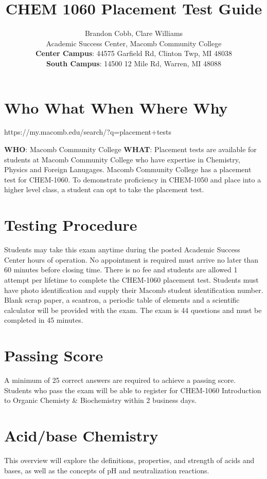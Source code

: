 \documentclass[10pt, roman]{article}
\title{CHEM 1060 Placement Test Guide}
\author{
Brandon Cobb, Clare Williams \\
Academic Success Center, Macomb Community College \\
\textbf{Center Campus}: 44575 Garfield Rd, Clinton Twp, MI 48038 \\
\textbf{South Campus}: 14500 12 Mile Rd, Warren, MI 48088
}
\begin{document}
\maketitle

\tableofcontents

\section{Who What When Where Why}
{\centering https://my.macomb.edu/search/?q=placement+tests\par}
\textbf{WHO}: Macomb Community College
\textbf{WHAT}: Placement tests are available for students at Macomb Community College who have expertise in Chemistry, Physics and Foreign Lanugages.
Macomb Community College has a placement test for CHEM-1060.
To demonstrate proficiency in CHEM-1050 and place into a higher level class, a student can opt to take the placement test.
\text

\section{Testing Procedure}
Students may take this exam anytime during the posted Academic Success Center hours of operation.
No appointment is required must arrive no later than 60 minutes before closing time.
There is no fee and students are allowed 1 attempt per lifetime to complete the CHEM-1060 placement test.
Students must have photo identification and supply their Macomb student identification number.
Blank scrap paper, a scantron, a periodic table of elements and a scientific calculator will be provided with the exam.
The exam is 44 questions and must be completed in 45 minutes.

\section{Passing Score}

A minimum of 25 correct answers are required to achieve a passing score.
Students who pass the exam will be able to register for CHEM-1060 Introduction to Organic Chemisty \& Biochemistry within 2 business days.

\section{Acid/base Chemistry}
This overview will explore the definitions, properties, and strength of acids and bases, as well as the concepts of pH and neutralization reactions.
\end{document}
